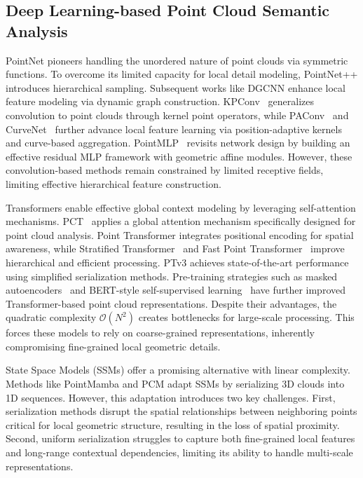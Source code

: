 \documentclass[a4paper,fleqn]{cas-dc}
\begin{document}
\subsection{Deep Learning-based Point Cloud Semantic Analysis}
PointNet \cite{pointnet} pioneers handling the unordered nature of point clouds via symmetric functions. To overcome its limited capacity for local detail modeling, PointNet++ \cite{PointNet++} introduces hierarchical sampling. Subsequent works like DGCNN \cite{DGCNN} enhance local feature modeling via dynamic graph construction. KPConv~\cite{KPConv} generalizes convolution to point clouds through kernel point operators, while PAConv~\cite{paconv} and CurveNet~\cite{curvenet} further advance local feature learning via position-adaptive kernels and curve-based aggregation. PointMLP~\cite{pointmlp} revisits network design by building an effective residual MLP framework with geometric affine modules. However, these convolution-based methods remain constrained by limited receptive fields, limiting effective hierarchical feature construction.

Transformers enable effective global context modeling by leveraging self-attention mechanisms. PCT~\cite{PCT} applies a global attention mechanism specifically designed for point cloud analysis. Point Transformer \cite{pt} integrates positional encoding for spatial awareness, while Stratified Transformer~\cite{stratified_transformer} and Fast Point Transformer~\cite{fast_point_transformer} improve hierarchical and efficient processing. PTv3 \cite{ptv3} achieves state-of-the-art performance using simplified serialization methods. Pre-training strategies such as masked autoencoders~\cite{pointmae} and BERT-style self-supervised learning~\cite{Point-BERT} have further improved Transformer-based point cloud representations. Despite their advantages, the quadratic complexity $\mathcal{O}(N^2)$ creates bottlenecks for large-scale processing. This forces these models to rely on coarse-grained representations, inherently compromising fine-grained local geometric
details.

State Space Models (SSMs) \cite{Mamba} offer a promising alternative with linear complexity. Methods like PointMamba \cite{PointMamba} and PCM \cite{pcm} adapt SSMs by serializing 3D clouds into 1D sequences.   However, this adaptation introduces two key challenges. First,
serialization methods disrupt the spatial relationships between
neighboring points critical for local geometric structure, resulting in
the loss of spatial proximity. Second, uniform serialization struggles to
capture both fine-grained local features and long-range contextual
dependencies, limiting its ability to handle multi-scale representations.
\end{document}
